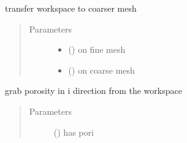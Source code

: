 \documentclass[letterpaper,10pt,english]{sphinxmanual}
\begin{document}
\begin{fulllineitems}
\begin{fulllineitems}
\begin{quote}
\begin{description}
\begin{itemize}
\end{itemize}

\end{description}\end{quote}

\end{fulllineitems}


\begin{fulllineitems}
\label{\detokenize{autoapi/NS_Airfoil/index:NS_Airfoil.NS_Airfoil.transfer_down}}
\sphinxAtStartPar
transfer workspace to coarser mesh
\begin{quote}\begin{description}
\item[{Parameters}] \leavevmode\begin{itemize}
\item {} 
\sphinxAtStartPar
{} ({\hyperref[\detokenize{autoapi/Workspace/index:Workspace.Workspace}]{}}) \textendash{} on fine mesh

\item {} 
\sphinxAtStartPar
{} ({\hyperref[\detokenize{autoapi/Workspace/index:Workspace.Workspace}]{}}) \textendash{} on coarse mesh

\end{itemize}

\end{description}\end{quote}

\end{fulllineitems}


\begin{fulllineitems}
\label{\detokenize{autoapi/NS_Airfoil/index:NS_Airfoil.NS_Airfoil.get_pori}}
\sphinxAtStartPar
grab porosity in i direction from the workspace
\begin{quote}\begin{description}
\item[{Parameters}] \leavevmode
\sphinxAtStartPar
{} ({\hyperref[\detokenize{autoapi/Workspace/index:Workspace.Workspace}]{}}) \textendash{} has pori


\end{description}
\end{quote}
\end{fulllineitems}
\end{fulllineitems}
\end{document}
